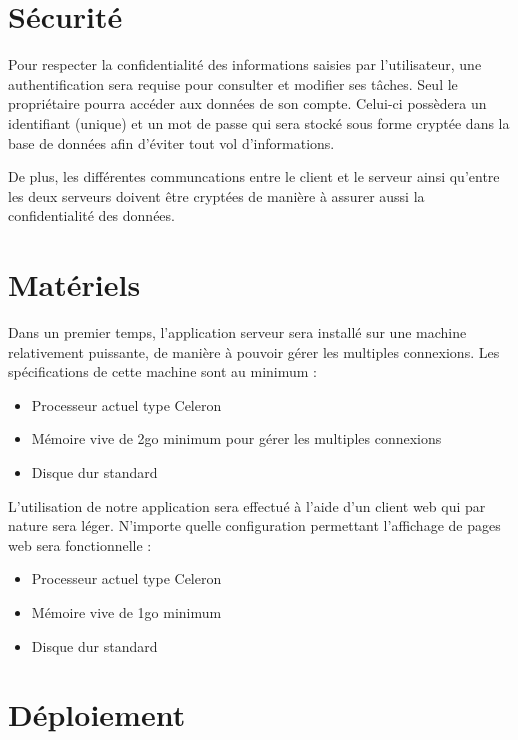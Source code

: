 \section{Sécurité}

Pour respecter la confidentialité des informations saisies par l'utilisateur, une authentification sera requise pour consulter et modifier ses tâches. Seul le propriétaire pourra accéder aux données de son compte. Celui-ci possèdera un identifiant (unique) et un mot de passe qui sera stocké sous forme cryptée dans la base de données afin d'éviter tout vol d'informations. 
\medskip

De plus, les différentes communcations entre le client et le serveur ainsi qu'entre les deux serveurs doivent être cryptées de manière à assurer aussi la confidentialité des données. 

 



\section{Matériels}

Dans un premier temps, l'application serveur sera installé sur une machine relativement puissante, de manière à pouvoir gérer les multiples connexions. Les spécifications de cette machine sont au minimum :

\begin{itemize}
\item Processeur actuel type Celeron
\item Mémoire vive de 2go minimum pour gérer les multiples connexions
\item Disque dur standard
\end{itemize}

L'utilisation de notre application sera effectué à l'aide d'un client web qui par nature sera léger. N'importe quelle configuration permettant l'affichage de pages web sera fonctionnelle :

\begin{itemize}
\item Processeur actuel type Celeron
\item Mémoire vive de 1go minimum
\item Disque dur standard
\end{itemize}



\section{Déploiement}

